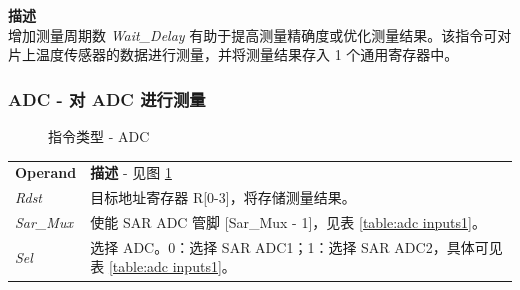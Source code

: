 \documentclass[main\_\_CN.tex]{subfiles}
\begin{document}
\textbf{描述} \\
增加测量周期数 \textit{Wait\_Delay} 有助于提高测量精确度或优化测量结果。该指令可对片上温度传感器的数据进行测量，并将测量结果存入 1 个通用寄存器中。


\subsubsection {ADC - 对 ADC 进行测量} \label{subsection:ADC}

%
%
%
%
%
\begin{figure}[!ht]
    \centering
    \caption{指令类型 - ADC}
    \label{figure:ADC}
\end{figure}

\begin{tabular}{ l l }
\textbf{Operand} & \textbf{描述} - 见图 \ref{figure:ADC} \\
\textit{Rdst} & 目标地址寄存器 R[0-3]，将存储测量结果。\\
\textit{Sar\_Mux} & 使能 SAR ADC 管脚 [Sar\_Mux - 1]，见表 \ref{table:adc inputs1}。 \\
\textit{Sel} & 选择 ADC。0：选择 SAR ADC1；1：选择 SAR ADC2，具体可见表 \ref{table:adc inputs1}。
\end{tabular}
\end{document}
